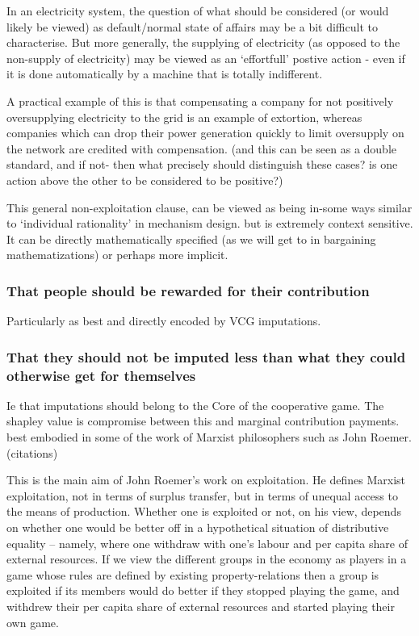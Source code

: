 \documentclass{article}
\begin{document}
In an electricity system, the question of what should be considered (or would likely be viewed) as default/normal state of affairs may be a bit difficult to characterise.
But more generally, the supplying of electricity (as opposed to the non-supply of electricity) may be viewed as an `effortfull' postive action - even if it is done automatically by a machine that is totally indifferent.

A practical example of this is that compensating a company for not positively oversupplying electricity to the grid is an example of extortion, whereas companies which can drop their power generation quickly to limit oversupply on the network are credited with compensation. (and this can be seen as a double standard, and if not- then what precisely should distinguish these cases? is one action above the other to be considered to be positive?)

This general non-exploitation clause, can be viewed as being in-some ways similar to `individual rationality' in mechanism design. but is extremely context sensitive.
It can be directly mathematically specified (as we will get to in bargaining mathematizations) or perhaps more implicit.

\subsubsection{That people should be rewarded for their contribution}

Particularly as best and directly encoded by VCG imputations.

\subsubsection{That they should not be imputed less than what they could otherwise get for themselves}

Ie that imputations should belong to the Core of the cooperative game.
The shapley value is compromise between this and marginal contribution payments.
best embodied in some of the work of Marxist philosophers such as John Roemer. (citations)

\begin{displayquote}
This is the main aim of John Roemer's work on exploitation. He defines Marxist exploitation, not in terms of surplus transfer, but in terms of unequal access to the means of production. Whether one is exploited or not, on his view, depends on whether one would be better off in a hypothetical situation of distributive equality -- namely, where one withdraw with one's labour and per capita share of external resources. If we view the different groups in the economy as players in a game whose rules are defined by existing property-relations then a group is exploited if its members would do better if they stopped playing the game, and withdrew their per capita share of external resources and started playing their own game.\cite{kymlicka2002contemporary}
\end{displayquote}
\end{document}
